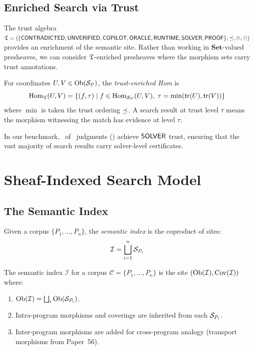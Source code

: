 \documentclass[11pt]{article}
\newcommand{\SemIndex}{\mathcal{I}}
\newcommand{\tr}{\mathsf{tr}}                        %
\newcommand{\Hom}{\mathrm{Hom}}                     %
\begin{document}
\subsection{Enriched Search via Trust}

The trust algebra $\mathfrak{T} = (\{\mathsf{CONTRADICTED}, \mathsf{UNVERIFIED}, \mathsf{COPILOT}, \mathsf{ORACLE},
\mathsf{RUNTIME}, \mathsf{SOLVER}, \mathsf{PROOF}\}, \preceq, \oplus, \ominus)$ provides an
enrichment of the semantic site.  Rather than working in
$\mathbf{Set}$-valued presheaves, we can consider $\mathfrak{T}$-enriched
presheaves where the morphism sets carry trust annotations.

\begin{definition}\label{def:trust-hom}
For coordinates $U, V \in \mathrm{Ob}(\mathcal{S}_P)$, the \emph{trust-enriched Hom}
is
\[
  \Hom_{\Talg}(U, V) = \{(f, \tau) \mid f \in \Hom_{\Site_P}(U, V),\;
  \tau = \min(\tr(U), \tr(V))\}
\]
where $\min$ is taken \wrt the trust ordering $\preceq$.  A search result
at trust level $\tau$ means the morphism witnessing the match has
evidence at level $\tau$.
\end{definition}

In our benchmark, \compTrustSolverdischarged\ of \compTrustTotal\
judgments (\compTrustSolverdischargedPct) achieve $\mathsf{SOLVER}$ trust,
ensuring that the vast majority of search results carry solver-level
certificates.

\section{Sheaf-Indexed Search Model}\label{sec:model}

\subsection{The Semantic Index}
Given a corpus $\{P_1, \ldots, P_n\}$, the \emph{semantic index} is the coproduct of sites:
\[
  \SemIndex = \bigsqcup_{i=1}^{n} \Site_{P_i}
\]

\begin{definition}\label{def:semantic-index}
The semantic index $\SemIndex$ for a corpus $\mathcal{C} = \{P_1,
\ldots, P_n\}$ is the site $(\Ob(\SemIndex), \Cov(\SemIndex))$ where:
\begin{enumerate}[noitemsep]
  \item $\Ob(\SemIndex) = \bigsqcup_{i} \Ob(\Site_{P_i})$.
  \item Intra-program morphisms and coverings are inherited from each
        $\mathcal{S}_{P_i}$.
  \item Inter-program morphisms are added for cross-program analogy
        (transport morphisms from Paper~56).
\end{enumerate}
\end{definition}
\end{document}
